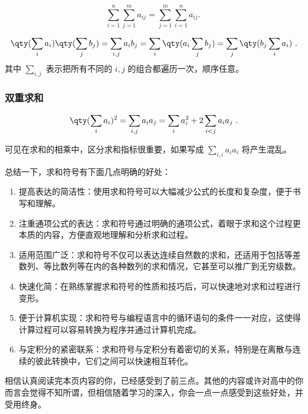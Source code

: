 \begin{equation}
\sum_{i=1}^n \sum_{j=1}^m a_{ij} = \sum_{j=1}^m \sum_{i=1}^n a_{ij}.~
\end{equation}


\begin{equation}
\qty(\sum_i a_i) \qty(\sum_j b_j) = \sum_{i,j} a_i b_j = \sum_i \qty(a_i \sum_j b_j) = \sum_j \qty(b_j \sum_i a_i)~.
\end{equation}
其中 $\sum\limits_{i,j}$ 表示把所有不同的 $i,j$ 的组合都遍历一次，顺序任意。

\subsubsection{双重求和}
\begin{equation}
\qty(\sum_i a_i)^2 = \sum_{i,j} a_i a_j = \sum_i a_i^2 + 2\sum_{i<j} a_i a_j~.
\end{equation}

可见在求和的相乘中，区分求和指标很重要，如果写成 $\sum\limits_{i,i} a_i a_i$ 将产生混乱。

总结一下，求和符号有下面几点明确的好处：

\begin{enumerate}
\item 提高表达的简洁性：使用求和符号可以大幅减少公式的长度和复杂度，便于书写和理解。
\item 注重通项公式的表达：求和符号通过明确的通项公式，着眼于求和这个过程更本质的内容，方便直观地理解和分析求和过程。
\item 适用范围广泛：求和符号不仅可以表达连续自然数的求和，还适用于包括等差数列、等比数列等在内的各种数列的求和情况，它甚至可以推广到无穷级数。
\item 快速化简：在熟练掌握求和符号的性质和技巧后，可以快速地对求和过程进行变形。
\item 便于计算机实现：求和符号与编程语言中的循环语句的条件一一对应，这使得计算过程可以容易转换为程序并通过计算机完成。
\item 与定积分的紧密联系：求和符号与定积分有着密切的关系，特别是在离散与连续的彼此转换中，它们之间可以快速相互转化。
\end{enumerate}

相信认真阅读完本页内容的你，已经感受到了前三点。其他的内容或许对高中的你而言会觉得不知所谓，但相信随着学习的深入，你会一点一点感受到这些好处，并受用终身。